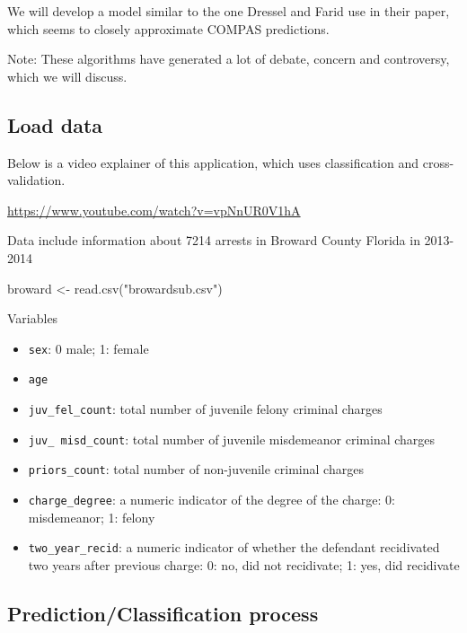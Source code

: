 \documentclass[
  letterpaper,
  DIV=11,
  numbers=noendperiod]{scrreprt}
\newenvironment{Shaded}{\begin{snugshade}}{\end{snugshade}}
\newcommand{\FunctionTok}[1]{\textcolor[rgb]{0.28,0.35,0.67}{#1}}
\newcommand{\NormalTok}[1]{\textcolor[rgb]{0.00,0.23,0.31}{#1}}
\newcommand{\OtherTok}[1]{\textcolor[rgb]{0.00,0.23,0.31}{#1}}
\newcommand{\StringTok}[1]{\textcolor[rgb]{0.13,0.47,0.30}{#1}}
\providecommand{\tightlist}{%
  \setlength{\itemsep}{0pt}\setlength{\parskip}{0pt}}\usepackage{longtable,booktabs,array}
\begin{document}
We will develop a model similar to the one Dressel and Farid use in
their paper, which seems to closely approximate COMPAS predictions.

Note: These algorithms have generated a lot of debate, concern and
controversy, which we will discuss.

\hypertarget{load-data}{%
\subsection{Load data}\label{load-data}}

Below is a video explainer of this application, which uses
classification and cross-validation.

\url{https://www.youtube.com/watch?v=vpNnUR0V1hA}

Data include information about 7214 arrests in Broward County Florida in
2013-2014

\begin{Shaded}
\begin{Highlighting}[]
\NormalTok{broward }\OtherTok{\textless{}{-}} \FunctionTok{read.csv}\NormalTok{(}\StringTok{"browardsub.csv"}\NormalTok{)}
\end{Highlighting}
\end{Shaded}

Variables

\begin{itemize}
\tightlist
\item
  \texttt{sex}: 0 male; 1: female
\item
  \texttt{age}
\item
  \texttt{juv\_fel\_count}: total number of juvenile felony criminal
  charges
\item
  \texttt{juv\_\ misd\_count}: total number of juvenile misdemeanor
  criminal charges
\item
  \texttt{priors\_count}: total number of non-juvenile criminal charges
\item
  \texttt{charge\_degree}: a numeric indicator of the degree of the
  charge: 0: misdemeanor; 1: felony
\item
  \texttt{two\_year\_recid}: a numeric indicator of whether the
  defendant recidivated two years after previous charge: 0: no, did not
  recidivate; 1: yes, did recidivate
\end{itemize}

\hypertarget{predictionclassification-process}{%
\subsection{Prediction/Classification
process}\label{predictionclassification-process}}
\end{document}
